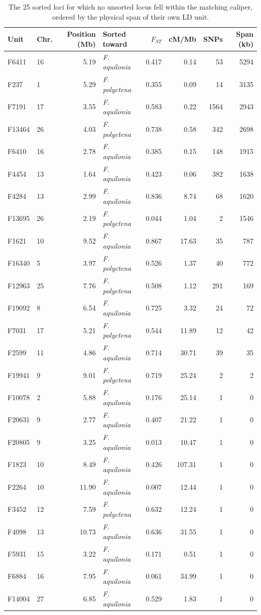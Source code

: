 \begin{table}[htbp]
\centering
\small
\caption{The 25 sorted loci for which no unsorted locus fell within the matching caliper, ordered by the physical span of their own LD unit.}
\label{tab:unmatched}
\begin{tabular}{llrlrrrr}
\toprule
Unit & Chr. & Position (Mb) & Sorted toward & $F_{ST}$ & cM/Mb & SNPs & Span (kb) \\
\midrule
F6411 & 16 & 5.19 & \textit{F. aquilonia} & 0.417 & 0.14 & 53 & 5294 \\
F237 & 1 & 5.29 & \textit{F. polyctena} & 0.355 & 0.09 & 14 & 3135 \\
F7191 & 17 & 3.55 & \textit{F. aquilonia} & 0.583 & 0.22 & 1564 & 2943 \\
F13464 & 26 & 4.03 & \textit{F. polyctena} & 0.738 & 0.58 & 342 & 2698 \\
F6410 & 16 & 2.78 & \textit{F. aquilonia} & 0.385 & 0.15 & 148 & 1915 \\
F4454 & 13 & 1.64 & \textit{F. aquilonia} & 0.423 & 0.06 & 382 & 1638 \\
F4284 & 13 & 2.99 & \textit{F. aquilonia} & 0.836 & 8.74 & 68 & 1620 \\
F13695 & 26 & 2.19 & \textit{F. polyctena} & 0.044 & 1.04 & 2 & 1546 \\
F1621 & 10 & 9.52 & \textit{F. aquilonia} & 0.867 & 17.63 & 35 & 787 \\
F16340 & 5 & 3.97 & \textit{F. polyctena} & 0.526 & 1.37 & 40 & 772 \\
F12963 & 25 & 7.76 & \textit{F. polyctena} & 0.508 & 1.12 & 291 & 169 \\
F19092 & 8 & 6.54 & \textit{F. aquilonia} & 0.725 & 3.32 & 24 & 72 \\
F7031 & 17 & 5.21 & \textit{F. polyctena} & 0.544 & 11.89 & 12 & 42 \\
F2599 & 11 & 4.86 & \textit{F. aquilonia} & 0.714 & 30.71 & 39 & 35 \\
F19941 & 9 & 9.01 & \textit{F. polyctena} & 0.719 & 25.24 & 2 & 2 \\
F10078 & 2 & 5.88 & \textit{F. aquilonia} & 0.176 & 25.14 & 1 & 0 \\
F20631 & 9 & 2.77 & \textit{F. aquilonia} & 0.407 & 21.22 & 1 & 0 \\
F20805 & 9 & 3.25 & \textit{F. aquilonia} & 0.013 & 10.47 & 1 & 0 \\
F1823 & 10 & 8.49 & \textit{F. aquilonia} & 0.426 & 107.31 & 1 & 0 \\
F2264 & 10 & 11.90 & \textit{F. aquilonia} & 0.007 & 12.44 & 1 & 0 \\
F3452 & 12 & 7.59 & \textit{F. polyctena} & 0.632 & 12.24 & 1 & 0 \\
F4098 & 13 & 10.73 & \textit{F. aquilonia} & 0.636 & 31.55 & 1 & 0 \\
F5931 & 15 & 3.22 & \textit{F. aquilonia} & 0.171 & 0.51 & 1 & 0 \\
F6884 & 16 & 7.95 & \textit{F. aquilonia} & 0.061 & 34.99 & 1 & 0 \\
F14004 & 27 & 6.85 & \textit{F. aquilonia} & 0.529 & 1.83 & 1 & 0 \\
\bottomrule
\end{tabular}
\end{table}
